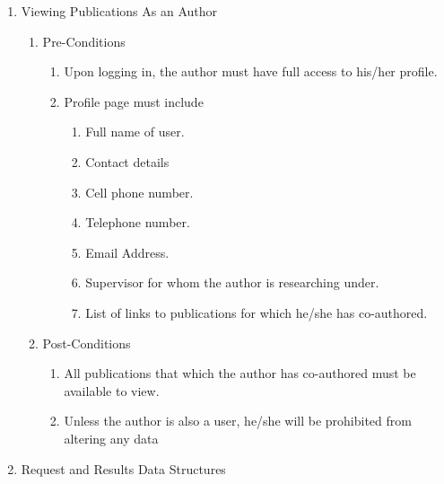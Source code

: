 \documentclass{article} %
\begin{document}
	\begin{enumerate}
		\item  Viewing Publications As an Author
		
		\begin{enumerate}
			\item  Pre-Conditions
			
			\begin{enumerate}
				\item  Upon logging in, the author must have full access to his/her profile.
				
				\item  Profile page must include
				
				\begin{enumerate}
					\item  Full name of user.
					
					\item  Contact details
					
					\item  Cell phone number.
					
					\item  Telephone number.
					
					\item  Email Address.
					
					\item  Supervisor for whom the author is researching under.
					
					\item  List of links to publications for which he/she has co-authored.
				\end{enumerate}
			\end{enumerate}
			
			\item  Post-Conditions
			
			\begin{enumerate}
				\item  All publications that which the author has co-authored must be available to view.
				
				\item  Unless the author is also a user, he/she will be prohibited from altering any data  
			\end{enumerate}
		\end{enumerate}
		
		\item  Request and Results Data Structures
	\end{enumerate}
	
\end{document}
